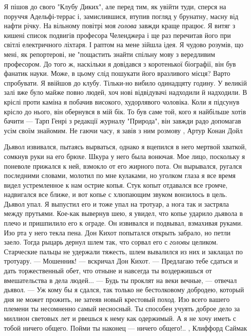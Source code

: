 Я пішов до свого "Клубу Диких", але перед тим, як увійти туди, сперся на
поруччя Адельфі-террас і, замислившися, втупив погляд у брунатну, масну від
нафти річку. На вільному повітрі моя \emph{голова} завжди краще працює. Я витяг з
кишені список подвигів професора Челенджера і ще раз перечитав його при світлі
електричного ліхтаря. І раптом на мене зійшла ідея. Я чудово розумів, що мені,
як репортерові, не "пощастить знайти спільну мову з вередливим професором. До
того ж, наскільки я довідався з коротенької біографії, він був фанатик науки.
Може, в цьому слід пошукати його вразливого місця? Варто спробувати.  Я ввійшов
до клубу. Тільки-но вибило одинадцяту годину. У великій залі вже було майже
повно людей, хоч нові відвідувачі надходили й надходили. В кріслі проти каміна
я побачив високого, худорлявого чоловіка. Коли я підсунув крісло до нього, він
обернувся в мій бік. То був саме той, кого я найбільше хотів бачити — Тарп
Генрі з редакції журналу "Природа", він завжди радо допомагав усім своїм
знайомим. Не гаючи часу, я завів з ним розмову
, Артур Конан Дойл

Дьявол извивался, пытаясь вырваться, однако я вцепился в него мертвой хваткой,
сомкнув руки на его брюхе. Шкура у него была вонючая. Мое лицо, поскольку я
поневоле прижался к ней, взмокло от его жирного пота. Он вырывался, ругался
последними словами, молотил по мне кулаками, но уголком глаза я все время видел
устремленное к нам острие копья. Стук копыт отдавался все громче, надвигался
все ближе, и вот копье с хлюпающим звуком вонзилось в цель. Дьявол упал. Я
выпустил его и тоже упал на тротуар, а нога так и застряла между прутьями.
Кое-как вывернув шею, я увидел, что копье ударило дьявола в плечо и пришпилило
его к ограде. Он извивался и подвывал, взмахивая руками. Изо рта у него текла
пена.  Дон Кихот попытался открыть забрало, но петли заело. Тогда рыцарь дернул
шлем так, что сорвал его с \emph{головы} целиком. Старческие пальцы не удержали
тяжесть, шлем вывалился из них и заклацал по тротуару.
— Мошенник! — вскричал Дон Кихот.  — Предлагаю тебе сдаться и дать
торжественный обет, что отныне и навсегда ты воздержишься от вмешательства в
дела людей... — Будь ты проклят на веки вечные, — отвечал дьявол.  — Уж кому
бы я сдался, так только не бестолковому добродею, который дня не может прожить,
не затеяв новый крестовый поход. Изо всего вашего племени ты несомненно самый
несносный. Ты способен учуять доброе дело за миллион световых лет и рвешься к
нему как одержимый. А я не хочу иметь с тобой ничего общего. Пойми ты наконец —
ничего общего!.. 
, Клиффорд Саймак
